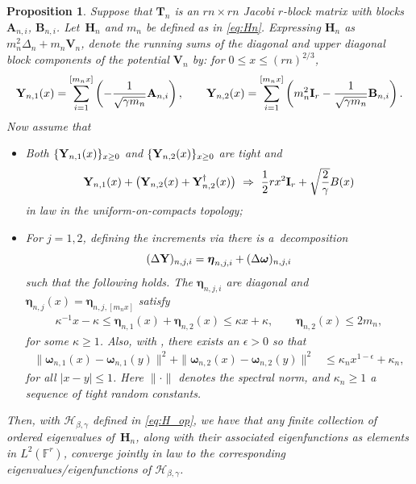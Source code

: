 \documentclass[pdftex]{sigma}
\numberwithin{equation}{section}
\newtheorem{Proposition}[Theorem]{Proposition}
\theoremstyle{definition}
\newcommand{\ww}{\boldsymbol\omega}
\newcommand{\nn}{\boldsymbol\eta}
\newcommand{\mbf}[1]{\mathbf{#1}}
\begin{document}
\begin{Proposition}
\label{Model_SoftEdgeConv}
Suppose that $\mbf{T}_n$ is an $rn\times rn$ Jacobi $r$-block matrix with blocks $\mbf{A}_{n,i}$, $\mbf{B}_{n,i}$. Let~$\mbf{H}_n$ and $m_n$ be defined as in \eqref{eq:Hn}.
Expressing $\mathbf{H}_n$ as $ m_n^2 \Delta_n + m_n {\mathbf{V}}_n$,
denote the running sums of the diagonal and upper diagonal block components of the potential $\mbf{V}_n$ by: for $0 \le x \le (rn)^{2/3}$,
\begin{align*}
\label{eq:potential_int}
 {\bf{Y}}_{n,1}(x) = \sum_{i=1}^{[m_n x]} \left( - \frac{1}{\sqrt{\gamma m_n}}
 \mathbf{A}_{n,i} \right),
 \qquad
 {\bf{Y}}_{n,2}(x) = \sum_{i=1}^{[m_n x]}
\left( m_n^2 \mbf{I}_r -
 \frac{1}{\sqrt{\gamma m_n}} \mathbf{B}_{n,i} \right).
\end{align*}
Now assume that
\begin{itemize}\itemsep=0pt
\item[$(i)$] Both $\{ {\bf{Y}}_{n,1}(x)\}_{x \ge 0}$ and
$\{ {\bf{Y}}_{n,2}(x)\}_{x \ge 0}$ are tight and
\begin{equation*}
\label{potential_convergence}
 {\bf{Y}}_{n,1}(x) +
 \bigl({\bf{Y}}_{n,2}(x) + {\bf{Y}}_{n,2}^{\dagger}(x) \bigr)\ \Rightarrow \
 \frac{1}{2} r x^2 \mbf{I}_r+ \sqrt{\frac{2}{\gamma}} B(x)
\end{equation*}
in law in the uniform-on-compacts topology;

\item[$(ii)$] For $j=1,2$, defining the increments via
\smash{$ {\bf{Y}}_{n,j}(x):=\frac{1}{\sqrt{\gamma m_n}} \sum_{i=1}^{[m_n x]}
 (\Delta {\bf{Y}})_{n,j,i}$}
 there is a~decomposition
\begin{equation*}
\label{potential_decomp}
 (\Delta {\bf{Y}})_{n, j,i}
 = \nn_{n,j,i} + (\Delta {\ww})_{n,j,i}
\end{equation*}
such that the following holds. The $\nn_{n,j, i} $ are diagonal and
$\nn_{n,j}(x) = \nn_{n,j,[m_nx]}$ satisfy
\begin{align}
 \kappa^{-1} x - \kappa \le \nn_{n,1}(x) + \nn_{n,2}(x) \le \kappa x + \kappa, \qquad
 \nn_{n,2}(x) \le 2 m_n, \label{compact1}
\end{align}
for some $\kappa \ge 1$. Also, with \smash{$\ww_{n,j}(x)=\sum_{i=1}^{[m_nx]} (\Delta {\ww})_{n,j,i}$}, there exists an $\epsilon > 0$ so that
\begin{align}
 \| \ww_{n,1}(x) - \ww_{n,1}(y)\|^2 + \| \ww_{n,2}(x) - \ww_{n,2}(y)\|^2 & \le \kappa_n x^{1-\epsilon} + \kappa_n, \label{compact3}
\end{align}
for all $|x-y| \le 1$. Here
$\|\cdot\|$ denotes the spectral norm, and $\kappa_n \ge 1$ a sequence of tight random constants.
\end{itemize}

Then, with $\mathcal{H}_{\beta, \gamma}$ defined in \eqref{eq:H_op},
we have
that any finite collection of ordered eigenvalues of~$\mathbf{H}_n$, along with their associated eigenfunctions as elements in $L^2 (\mathbb{F}^r)$, converge jointly in law to the corresponding eigenvalues/eigenfunctions of $ \mathcal{H}_{\beta, \gamma}$.
\end{Proposition}
\end{document}
